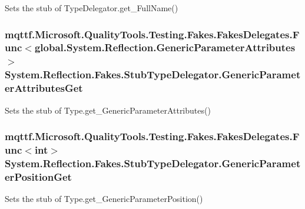Sets the stub of Type\-Delegator.\-get\-\_\-\-Full\-Name()

\hypertarget{class_system_1_1_reflection_1_1_fakes_1_1_stub_type_delegator_a8bf19976cc8abea414f6892241768330}{
\subsubsection[{Generic\-Parameter\-Attributes\-Get}]{\setlength{\rightskip}{0pt plus 5cm}mqttf.\-Microsoft.\-Quality\-Tools.\-Testing.\-Fakes.\-Fakes\-Delegates.\-Func$<$global.\-System.\-Reflection.\-Generic\-Parameter\-Attributes$>$ System.\-Reflection.\-Fakes.\-Stub\-Type\-Delegator.\-Generic\-Parameter\-Attributes\-Get}}\label{class_system_1_1_reflection_1_1_fakes_1_1_stub_type_delegator_a8bf19976cc8abea414f6892241768330}


Sets the stub of Type.\-get\-\_\-\-Generic\-Parameter\-Attributes()

\hypertarget{class_system_1_1_reflection_1_1_fakes_1_1_stub_type_delegator_ac1a2e3a2d09a1886b517906f65c48d19}{
\subsubsection[{Generic\-Parameter\-Position\-Get}]{\setlength{\rightskip}{0pt plus 5cm}mqttf.\-Microsoft.\-Quality\-Tools.\-Testing.\-Fakes.\-Fakes\-Delegates.\-Func$<$int$>$ System.\-Reflection.\-Fakes.\-Stub\-Type\-Delegator.\-Generic\-Parameter\-Position\-Get}}\label{class_system_1_1_reflection_1_1_fakes_1_1_stub_type_delegator_ac1a2e3a2d09a1886b517906f65c48d19}


Sets the stub of Type.\-get\-\_\-\-Generic\-Parameter\-Position()

